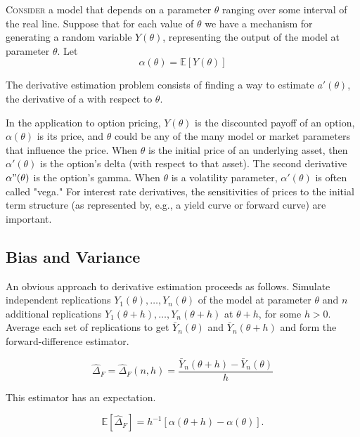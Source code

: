 \lettrine[lines=2, lhang=0.1]{C}{onsider} a model that depends on a parameter $\theta$ ranging over some interval of the real line. Suppose that for each value of $\theta$ we have a mechanism for generating a random variable $Y(\theta)$, representing the output of the model at
parameter $\theta$. Let
\begin{equation}
	\alpha(\theta) = \mathbb{E}[Y(\theta)]
	\label{eq:ExpectedModelOutput} \nonumber
\end{equation}

The derivative estimation problem consists of finding a way to estimate $a'(\theta)$, the derivative of a with respect to $\theta$.

In the application to option pricing, $Y(\theta)$ is the discounted payoff of an option, $\alpha(\theta)$ is its price, and $\theta$ could be any of the many model or market parameters that influence the price. When $\theta$ is the initial price of an underlying asset, then $\alpha'(\theta)$ is the option's delta (with respect to that asset). The second derivative $\alpha"(\theta)$ is the option's gamma. When $\theta$ is a volatility parameter, $\alpha'(\theta)$ is often called "vega." For interest rate derivatives, the sensitivities of prices to the initial term structure (as represented by, e.g., a yield curve or forward curve) are important.

\subsection{Bias and Variance}

An obvious approach to derivative estimation proceeds as follows. Simulate independent replications $Y_1(\theta),\dots,Y_n(\theta)$ of the model at parameter $\theta$ and $n$ additional replications $Y_1(\theta+h),\dots,Y_n(\theta+h)$ at $\theta + h$, for some $h>0$. Average each set of replications to get $\bar{Y}_n(\theta)$ and $\bar{Y}_n(\theta + h)$ and form the forward-difference estimator.

\begin{equation}
	\hat{\Delta}_F = \hat{\Delta}_F(n,h) = \frac{\bar{Y}_n(\theta+h) - \bar{Y}_n(\theta)}{h}
	\label{eq:ForwardDiffEstimator}
\end{equation}

This estimator has an expectation.

\begin{equation}
	\mathbb{E}[\hat{\Delta}_F] = h^{-1}[\alpha(\theta+h) - \alpha(\theta)].
	\label{eq:ForwardDiffExpectation}
\end{equation}

